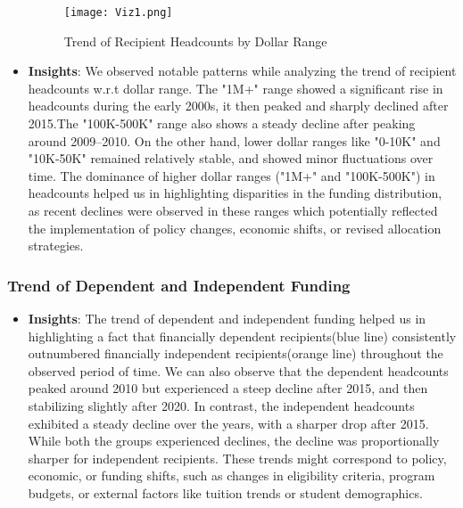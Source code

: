\documentclass[sigconf]{acmart}
\begin{document}
\begin{itemize}
    \begin{figure}[h] 
        \centering
        \texttt{[image: Viz1.png]} 
        \caption{Trend of Recipient Headcounts by Dollar Range}
        \label{fig:data_viz}
    \end{figure}
    \item \textbf{Insights}:
    We observed notable patterns while analyzing the trend of recipient headcounts w.r.t dollar range. The "1M+" range showed a significant rise in headcounts during the early 2000s, it then peaked and sharply declined after 2015.The "100K-500K" range also shows a steady decline after peaking around 2009–2010. On the other hand, lower dollar ranges like "0-10K" and "10K-50K" remained relatively stable, and showed minor fluctuations over time. The dominance of higher dollar ranges ("1M+" and "100K-500K") in headcounts helped us in highlighting disparities in the funding distribution, as recent declines were observed in these ranges which potentially reflected the implementation of policy changes, economic shifts, or revised allocation strategies.
\end{itemize}

\subsubsection{\textbf{Trend of Dependent and Independent Funding}}
\begin{itemize}
    \begin{figure}[h] 
        \centering
        \texttt{[image: Viz2.png]}
        \caption{Trend of Dependent and Independent Funding}
        \label{fig:data_viz}
    \end{figure}
    \item \textbf{Insights}:
    The trend of dependent and independent funding helped us in highlighting a fact that financially dependent recipients(blue line) consistently outnumbered financially independent recipients(orange line) throughout the observed period of time. We can also observe that the dependent headcounts peaked around 2010 but experienced a steep decline after 2015, and then stabilizing slightly after 2020. In contrast, the independent headcounts exhibited a steady decline over the years, with a sharper drop after 2015. While both the groups experienced declines, the decline was proportionally sharper for independent recipients. These trends might correspond to policy, economic, or funding shifts, such as changes in eligibility criteria, program budgets, or external factors like tuition trends or student demographics.
\end{itemize}
\end{document}
